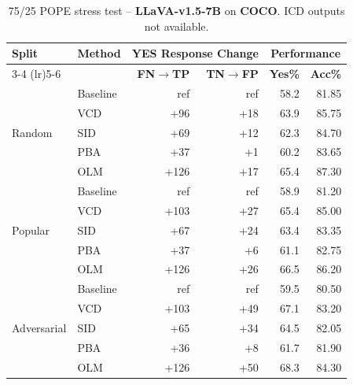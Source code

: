 \documentclass[11pt]{article}
\begin{document}

\begin{table}[ht]
\centering
\caption{75/25 POPE stress test -- \textbf{LLaVA-v1.5-7B} on \textbf{COCO}. ICD outputs not available.}
\label{tab:75_25_llava_coco}
\setlength{\tabcolsep}{6pt}
\renewcommand{\arraystretch}{1.1}
\begin{tabular}{l|l|rr|rr}
\toprule
\multirow{2}{*}{\textbf{Split}} &
\multirow{2}{*}{\textbf{Method}} &
\multicolumn{2}{c|}{\textbf{YES Response Change}} &
\multicolumn{2}{c}{\textbf{Performance}} \\
\cmidrule(lr){3-4} \cmidrule(lr){5-6}
& & \textbf{FN$\to$TP} & \textbf{TN$\to$FP} & \textbf{Yes\%} & \textbf{Acc\%} \\
\midrule

\multirow{5}{*}{Random}
& Baseline & ref  & ref  & 58.2 & 81.85 \\
& VCD      & +96  & +18  & 63.9 & 85.75 \\
& SID      & +69  & +12  & 62.3 & 84.70 \\
& PBA      & +37  & +1   & 60.2 & 83.65 \\
& OLM      & +126 & +17  & 65.4 & 87.30 \\
\midrule

\multirow{5}{*}{Popular}
& Baseline & ref  & ref  & 58.9 & 81.20 \\
& VCD      & +103 & +27  & 65.4 & 85.00 \\
& SID      & +67  & +24  & 63.4 & 83.35 \\
& PBA      & +37  & +6   & 61.1 & 82.75 \\
& OLM      & +126 & +26  & 66.5 & 86.20 \\
\midrule

\multirow{5}{*}{Adversarial}
& Baseline & ref  & ref  & 59.5 & 80.50 \\
& VCD      & +103 & +49  & 67.1 & 83.20 \\
& SID      & +65  & +34  & 64.5 & 82.05 \\
& PBA      & +36  & +8   & 61.7 & 81.90 \\
& OLM      & +126 & +50  & 68.3 & 84.30 \\
\bottomrule
\end{tabular}
\end{table}

\end{document}
